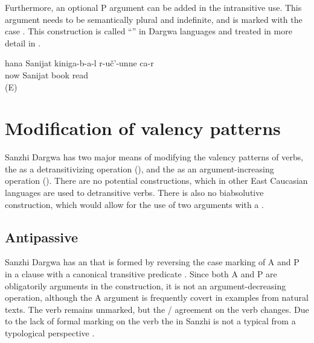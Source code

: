 Furthermore, an optional P argument can be added in the intransitive use. This argument needs to be semantically plural and indefinite, and is marked with the  case . This construction is called ``'' in Dargwa languages and treated in more detail in . 

\begin{exe}
	\ex	\label{ex:Now Sanijat reads books}
	\gll	hana Sanijat kiniga-b-a-l	r-uč'-unne	ca-r\\
		now	Sanijat	book	read	\\
	\glt	{} (E)
\end{exe}


\section{Modification of valency patterns}
\label{cpt:Modification of valency patterns}

Sanzhi Dargwa has two major means of modifying the valency patterns of verbs, the  as a detransitivizing operation (), and the  as an argument-increasing operation (). There are no potential constructions, which in other East Caucasian languages are used to detransitive verbs. There is also no biabsolutive construction, which would allow for the use of two  arguments with a .



\subsection{Antipassive}
\label{sec:Antipassive}

Sanzhi Dargwa has an  that is formed by reversing the case marking of A and P in a clause with a canonical transitive predicate . Since both A and P are obligatorily arguments in the  construction, it is not an argument-decreasing operation, although the A argument is frequently covert in examples from natural texts. The verb remains unmarked, but the / agreement on the verb changes. Due to the lack of formal marking on the verb the  in Sanzhi is not a typical  from a typological perspective \citep{Polinsky2005}. 

